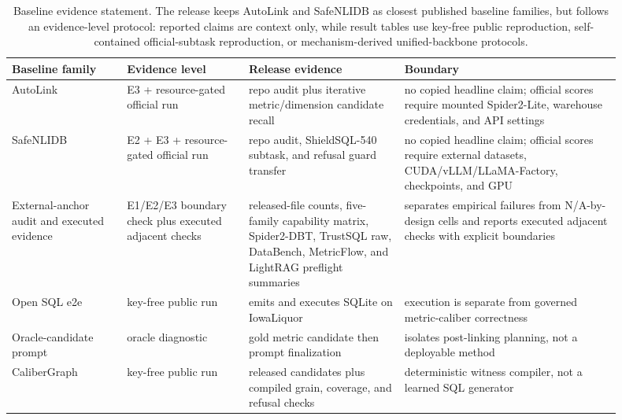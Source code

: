 \documentclass[letterpaper]{article}
\begin{document}
\begin{table}[h]
\centering
\scriptsize
\setlength{\tabcolsep}{2pt}
\begin{tabular}{@{}>{\raggedright\arraybackslash}p{0.17\linewidth}>{\raggedright\arraybackslash}p{0.18\linewidth}>{\raggedright\arraybackslash}p{0.23\linewidth}>{\raggedright\arraybackslash}p{0.32\linewidth}@{}}
\toprule
Baseline family & Evidence level & Release evidence & Boundary \\
\midrule
AutoLink & E3 + resource-gated official run & repo audit plus iterative metric/dimension candidate recall & no copied headline claim; official scores require mounted Spider2-Lite, warehouse credentials, and API settings \\
SafeNLIDB & E2 + E3 + resource-gated official run & repo audit, ShieldSQL-540 subtask, and refusal guard transfer & no copied headline claim; official scores require external datasets, CUDA/vLLM/LLaMA-Factory, checkpoints, and GPU \\
External-anchor audit and executed evidence & E1/E2/E3 boundary check plus executed adjacent checks & released-file counts, five-family capability matrix, Spider2-DBT, TrustSQL raw, DataBench, MetricFlow, and LightRAG preflight summaries & separates empirical failures from N/A-by-design cells and reports executed adjacent checks with explicit boundaries \\
Open SQL e2e & key-free public run & emits and executes SQLite on IowaLiquor & execution is separate from governed metric-caliber correctness \\
Oracle-candidate prompt & oracle diagnostic & gold metric candidate then prompt finalization & isolates post-linking planning, not a deployable method \\
CaliberGraph & key-free public run & released candidates plus compiled grain, coverage, and refusal checks & deterministic witness compiler, not a learned SQL generator \\
\bottomrule
\end{tabular}
\caption{Baseline evidence statement. The release keeps AutoLink and SafeNLIDB as closest published baseline families, but follows an evidence-level protocol: reported claims are context only, while result tables use key-free public reproduction, self-contained official-subtask reproduction, or mechanism-derived unified-backbone protocols.}
\end{table}
\end{document}
